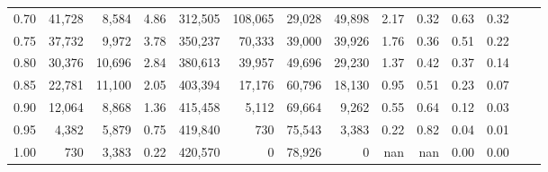 \begin{tabular}{rrrrrrrrrrrrrr}
0.70 &  41,728 &   8,584 &     4.86 &  312,505 &  108,065 &  29,028 &  49,898 &  2.17 &  0.32 &  0.63 &      0.32 \\
0.75 &  37,732 &   9,972 &     3.78 &  350,237 &   70,333 &  39,000 &  39,926 &  1.76 &  0.36 &  0.51 &      0.22 \\
0.80 &  30,376 &  10,696 &     2.84 &  380,613 &   39,957 &  49,696 &  29,230 &  1.37 &  0.42 &  0.37 &      0.14 \\
0.85 &  22,781 &  11,100 &     2.05 &  403,394 &   17,176 &  60,796 &  18,130 &  0.95 &  0.51 &  0.23 &      0.07 \\
0.90 &  12,064 &   8,868 &     1.36 &  415,458 &    5,112 &  69,664 &   9,262 &  0.55 &  0.64 &  0.12 &      0.03 \\
0.95 &   4,382 &   5,879 &     0.75 &  419,840 &      730 &  75,543 &   3,383 &  0.22 &  0.82 &  0.04 &      0.01 \\
1.00 &     730 &   3,383 &     0.22 &  420,570 &        0 &  78,926 &       0 &   nan &   nan &  0.00 &      0.00 \\
\bottomrule
\end{tabular}
